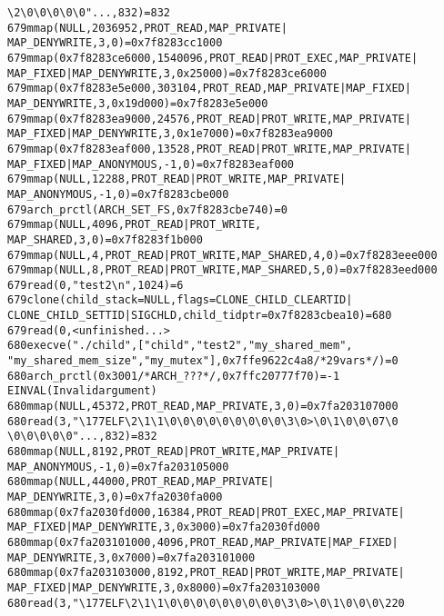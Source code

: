\documentclass[pdf, unicode, 12pt, a4paper,oneside,fleqn]{article}
\begin{document}
\begin{alltt}
\textbackslash2\textbackslash0\textbackslash0\textbackslash0\textbackslash0\textbackslash0"..., 832) = 832
679   mmap(NULL, 2036952, PROT_READ, MAP_PRIVATE|
MAP_DENYWRITE, 3, 0) = 0x7f8283cc1000
679   mmap(0x7f8283ce6000, 1540096, PROT_READ|PROT_EXEC, MAP_PRIVATE|
MAP_FIXED|MAP_DENYWRITE, 3, 0x25000) = 0x7f8283ce6000
679   mmap(0x7f8283e5e000, 303104, PROT_READ, MAP_PRIVATE|MAP_FIXED|
MAP_DENYWRITE, 3, 0x19d000) = 0x7f8283e5e000
679   mmap(0x7f8283ea9000, 24576, PROT_READ|PROT_WRITE, MAP_PRIVATE|
MAP_FIXED|MAP_DENYWRITE, 3, 0x1e7000) = 0x7f8283ea9000
679   mmap(0x7f8283eaf000, 13528, PROT_READ|PROT_WRITE, MAP_PRIVATE|
MAP_FIXED|MAP_ANONYMOUS, -1, 0) = 0x7f8283eaf000
679   mmap(NULL, 12288, PROT_READ|PROT_WRITE, MAP_PRIVATE|
MAP_ANONYMOUS, -1, 0) = 0x7f8283cbe000
679   arch_prctl(ARCH_SET_FS, 0x7f8283cbe740) = 0
679   mmap(NULL, 4096, PROT_READ|PROT_WRITE, 
MAP_SHARED, 3, 0) = 0x7f8283f1b000
679   mmap(NULL, 4, PROT_READ|PROT_WRITE, MAP_SHARED, 4, 0) = 0x7f8283eee000
679   mmap(NULL, 8, PROT_READ|PROT_WRITE, MAP_SHARED, 5, 0) = 0x7f8283eed000
679   read(0, "test2\textbackslash{n}", 1024)          = 6
679   clone(child_stack=NULL, flags=CLONE_CHILD_CLEARTID|
CLONE_CHILD_SETTID|SIGCHLD, child_tidptr=0x7f8283cbea10) = 680
679   read(0,  <unfinished ...>
680   execve("./child", ["child", "test2", "my_shared_mem",
"my_shared_mem_size","my_mutex"], 0x7ffe9622c4a8 /* 29 vars */) = 0
680   arch_prctl(0x3001 /* ARCH_??? */, 0x7ffc20777f70) = -1 
EINVAL (Invalid argument)
680   mmap(NULL, 45372, PROT_READ, MAP_PRIVATE, 3, 0) = 0x7fa203107000
680   read(3, "\textbackslash177ELF\textbackslash2\textbackslash1\textbackslash1\textbackslash0\textbackslash0\textbackslash0\textbackslash0\textbackslash0\textbackslash0\textbackslash0\textbackslash0\textbackslash0\textbackslash3\textbackslash0>\textbackslash0\textbackslash1\textbackslash0\textbackslash0\textbackslash0 7\textbackslash0
\textbackslash0\textbackslash0\textbackslash0\textbackslash0\textbackslash0"..., 832) = 832
680   mmap(NULL, 8192, PROT_READ|PROT_WRITE, MAP_PRIVATE|
MAP_ANONYMOUS, -1, 0) = 0x7fa203105000
680   mmap(NULL, 44000, PROT_READ, MAP_PRIVATE|
MAP_DENYWRITE, 3, 0) = 0x7fa2030fa000
680   mmap(0x7fa2030fd000, 16384, PROT_READ|PROT_EXEC, MAP_PRIVATE|
MAP_FIXED|MAP_DENYWRITE, 3, 0x3000) = 0x7fa2030fd000
680   mmap(0x7fa203101000, 4096, PROT_READ, MAP_PRIVATE|MAP_FIXED|
MAP_DENYWRITE, 3, 0x7000) = 0x7fa203101000
680   mmap(0x7fa203103000, 8192, PROT_READ|PROT_WRITE, MAP_PRIVATE|
MAP_FIXED|MAP_DENYWRITE, 3, 0x8000) = 0x7fa203103000
680   read(3, "\textbackslash177ELF\textbackslash2\textbackslash1\textbackslash1\textbackslash0\textbackslash0\textbackslash0\textbackslash0\textbackslash0\textbackslash0\textbackslash0\textbackslash0\textbackslash0\textbackslash3\textbackslash0>\textbackslash0\textbackslash1\textbackslash0\textbackslash0\textbackslash0\textbackslash220

\end{alltt}
\end{document}
